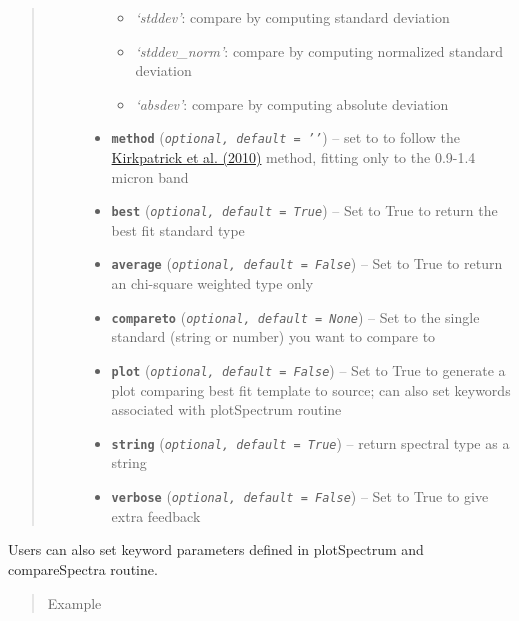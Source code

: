 \documentclass[letterpaper,10pt,english]{sphinxmanual}
\begin{document}
\begin{fulllineitems}
\begin{quote}
\begin{description}
\begin{itemize}
\begin{itemize}
\item {} 
\emph{`stddev'}: compare by computing standard deviation

\item {} 
\emph{`stddev\_norm'}: compare by computing normalized standard deviation

\item {} 
\emph{`absdev'}: compare by computing absolute deviation

\end{itemize}


\item {} 
\textbf{\texttt{method}} (\emph{\texttt{optional, default = '{'}}}) -- 
set to  to follow the \href{http://adsabs.harvard.edu/abs/2010ApJS..190..100K}{Kirkpatrick et al. (2010)} method, fitting only to the 0.9-1.4 micron band


\item {} 
\textbf{\texttt{best}} (\emph{\texttt{optional, default = True}}) -- Set to True to return the best fit standard type

\item {} 
\textbf{\texttt{average}} (\emph{\texttt{optional, default = False}}) -- Set to True to return an chi-square weighted type only

\item {} 
\textbf{\texttt{compareto}} (\emph{\texttt{optional, default = None}}) -- Set to the single standard (string or number) you want to compare to

\item {} 
\textbf{\texttt{plot}} (\emph{\texttt{optional, default = False}}) -- Set to True to generate a plot comparing best fit template to source; can also set keywords associated with plotSpectrum routine

\item {} 
\textbf{\texttt{string}} (\emph{\texttt{optional, default = True}}) -- return spectral type as a string

\item {} 
\textbf{\texttt{verbose}} (\emph{\texttt{optional, default = False}}) -- Set to True to give extra feedback

\end{itemize}

\end{description}\end{quote}

Users can also set keyword parameters defined in plotSpectrum and compareSpectra routine.
\begin{quote}\begin{description}
\item[{Example}] \leavevmode
\end{description}\end{quote}


\end{fulllineitems}
\end{document}
